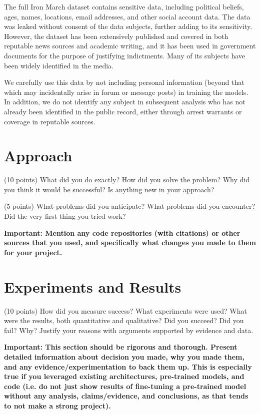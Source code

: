\documentclass[10pt,twocolumn,letterpaper]{article}
\begin{document}
The full Iron March dataset contains sensitive data, including political beliefs, ages, names, locations, email addresses, and other social account data. The data was leaked without consent of the data subjects, further adding to its sensitivity. However, the dataset has been extensively published and covered in both reputable news sources and academic writing, and it has been used in government documents for the purpose of justifying indictments. Many of its subjects have been widely identified in the media. 

We carefully use this data by not including personal information (beyond that which may incidentally arise in forum or message posts) in training the models. In addition, we do not identify any subject in subsequent analysis who has not already been identified in the public record, either through arrest warrants or coverage in reputable sources.
\section{Approach}

(10 points) What did you do exactly? How did you solve the problem? Why did you think it would be successful? Is anything new in your approach? 

(5 points) What problems did you anticipate? What problems did you encounter? Did the very first thing you tried work? 

\textbf{Important: Mention any code repositories (with citations) or other sources that you used, and specifically what changes you made to them for your project. }

\section{Experiments and Results}

(10 points) How did you measure success? What experiments were used? What were the results, both quantitative and qualitative? Did you succeed? Did you fail? Why? Justify your reasons with arguments supported by evidence and data.

\textbf{Important: This section should be rigorous and thorough. Present detailed information about decision you made, why you made them, and any evidence/experimentation to back them up. This is especially true if you leveraged existing architectures, pre-trained models, and code (i.e. do not just show results of fine-tuning a pre-trained model without any analysis, claims/evidence, and conclusions, as that tends to not make a strong project). }
\end{document}
